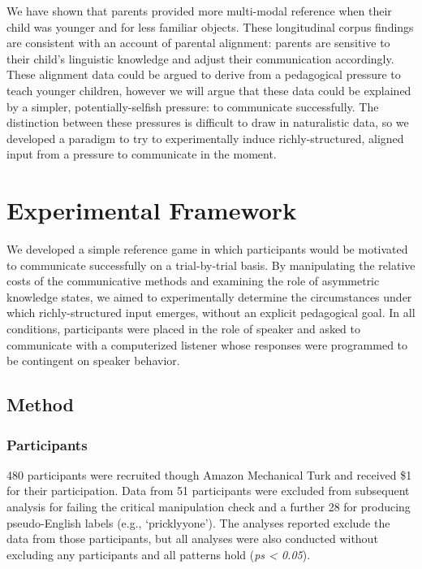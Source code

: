 \documentclass[10pt, letterpaper]{article}
\begin{document}
We have shown that parents provided more multi-modal reference when
their child was younger and for less familiar objects. These
longitudinal corpus findings are consistent with an account of parental
alignment: parents are sensitive to their child's linguistic knowledge
and adjust their communication accordingly. These alignment data could
be argued to derive from a pedagogical pressure to teach younger
children, however we will argue that these data could be explained by a
simpler, potentially-selfish pressure: to communicate successfully. The
distinction between these pressures is difficult to draw in naturalistic
data, so we developed a paradigm to try to experimentally induce
richly-structured, aligned input from a pressure to communicate in the
moment.

\section{Experimental Framework}\label{experimental-framework}

We developed a simple reference game in which participants would be
motivated to communicate successfully on a trial-by-trial basis. By
manipulating the relative costs of the communicative methods and
examining the role of asymmetric knowledge states, we aimed to
experimentally determine the circumstances under which richly-structured
input emerges, without an explicit pedagogical goal. In all conditions,
participants were placed in the role of speaker and asked to communicate
with a computerized listener whose responses were programmed to be
contingent on speaker behavior.

\subsection{Method}\label{method}

\subsubsection{Participants}\label{participants}

480 participants were recruited though Amazon Mechanical Turk and
received \$1 for their participation. Data from 51 participants were
excluded from subsequent analysis for failing the critical manipulation
check and a further 28 for producing pseudo-English labels (e.g.,
`pricklyyone'). The analyses reported exclude the data from those
participants, but all analyses were also conducted without excluding any
participants and all patterns hold (\emph{ps \textless{} 0.05}).
\end{document}
